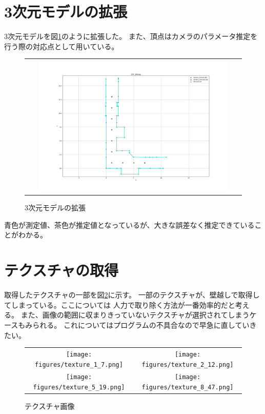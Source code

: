 \documentclass[]{jarticle}          %
\begin{document}
\section{3次元モデルの拡張}
3次元モデルを図\ref{one}のように拡張した。
また、頂点はカメラのパラメータ推定を行う際の対応点として用いている。
\begin{figure}[H]
  \begin{center}
    \begin{tabular}{c}
      \includegraphics[width=0.9\textwidth]{figures/C5F_2dmap.png}
    \end{tabular}
  \end{center}
  \caption{3次元モデルの拡張}
  \label{one}
\end{figure}
青色が測定値、茶色が推定値となっているが、大きな誤差なく推定できていることがわかる。
\section{テクスチャの取得}
取得したテクスチャの一部を図\ref{two}に示す。
一部のテクスチャが、壁越しで取得してしまっている。ここについては
人力で取り除く方法が一番効率的だと考える。
また、画像の範囲に収まりきっていないテクスチャが選択されてしまうケースもみられる。
これについてはプログラムの不具合なので早急に直していきたい。
\begin{figure}[H]
  \begin{center}
    \begin{tabular}{cc}
      \texttt{[image: figures/texture\_1\_7.png]}&
      \texttt{[image: figures/texture\_2\_12.png]}\\
      \texttt{[image: figures/texture\_5\_19.png]}&
      \texttt{[image: figures/texture\_8\_47.png]}\\
    \end{tabular}
  \end{center}
  \caption{テクスチャ画像}
  \label{two}
\end{figure}
\end{document}

